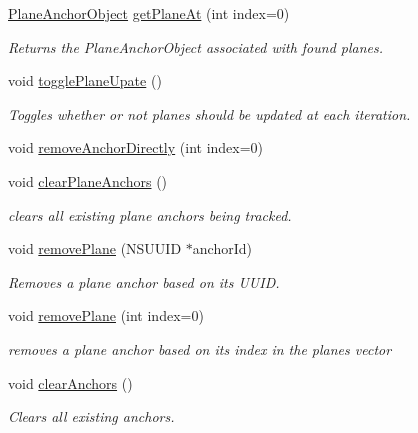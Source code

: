 \begin{DoxyCompactItemize}
\hyperlink{struct_a_r_objects_1_1_plane_anchor_object}{Plane\+Anchor\+Object} \hyperlink{class_a_r_core_1_1_a_r_anchor_manager_ac885fded5a2a2f5c0b58506786e069f1}{get\+Plane\+At} (int index=0)
\begin{DoxyCompactList}\small\item\em Returns the Plane\+Anchor\+Object associated with found planes. \end{DoxyCompactList}\item 
void \hyperlink{class_a_r_core_1_1_a_r_anchor_manager_a78da6cdbe64e12e49dc67adef5ac085b}{toggle\+Plane\+Upate} ()
\begin{DoxyCompactList}\small\item\em Toggles whether or not planes should be updated at each iteration. \end{DoxyCompactList}\item 
void \hyperlink{class_a_r_core_1_1_a_r_anchor_manager_aeaa578780e37129fb899b3f5a762af63}{remove\+Anchor\+Directly} (int index=0)
\item 
void \hyperlink{class_a_r_core_1_1_a_r_anchor_manager_aec308e2f34682a568b2bda022a21a3ed}{clear\+Plane\+Anchors} ()
\begin{DoxyCompactList}\small\item\em clears all existing plane anchors being tracked. \end{DoxyCompactList}\item 
void \hyperlink{class_a_r_core_1_1_a_r_anchor_manager_a65690e39286b733631eb52c8e740bc79}{remove\+Plane} (N\+S\+U\+U\+ID $\ast$anchor\+Id)
\begin{DoxyCompactList}\small\item\em Removes a plane anchor based on it\textquotesingle{}s U\+U\+ID. \end{DoxyCompactList}\item 
void \hyperlink{class_a_r_core_1_1_a_r_anchor_manager_a7d01736351089d31708ca4c577da99a4}{remove\+Plane} (int index=0)
\begin{DoxyCompactList}\small\item\em removes a plane anchor based on it\textquotesingle{}s index in the planes vector \end{DoxyCompactList}\item 
void \hyperlink{class_a_r_core_1_1_a_r_anchor_manager_af78ff242457a15c5073b8a2557a96974}{clear\+Anchors} ()
\begin{DoxyCompactList}\small\item\em Clears all existing anchors. \end{DoxyCompactList}\item 

\end{DoxyCompactItemize}
